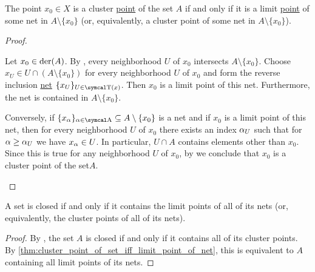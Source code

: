 \begin{proposition}\label{thm:cluster_point_of_set_iff_limit_point_of_net}
  The point \( x_0 \in X \) is a cluster \hyperref[def:topological_derived_set/cluster_point]{point} of the set \( A \) if and only if it is a limit \hyperref[def:net_convergence/cluster]{point} of some net in \( A \setminus \{ x_0 \} \) (or, equivalently, a cluster point of some net in \( A \setminus \{ x_0 \} \)).
\end{proposition}
\begin{proof}\mbox{}
  \begin{description}
    \Implies Let \( x_0 \in \operatorname{der}(A) \). By , every neighborhood \( U \) of \( x_0 \) intersects \( A \setminus \{ x_0 \} \). Choose\LEM \( x_U \in U \cap (A \setminus \{ x_0 \}) \) for every neighborhood \( U \) of \( x_0 \) and form the reverse inclusion \hyperref[ex:reverse_inclusion_net]{net} \( \{ x_U \}_{U \in \CT(x)} \). Then \( x_0 \) is a limit point of this net. Furthermore, the net is contained in \( A \setminus \{ x_0 \} \).

    \ImpliedBy Conversely, if \( \{ x_\al \}_{\al \in \CA} \subseteq A \setminus \{ x_0 \} \) is a net and if \( x_0 \) is a limit point of this net, then for every neighborhood \( U \) of \( x_0 \) there exists an index \( \alpha_U \) such that for \( \alpha \geq \alpha_U \) we have \(  x_\alpha \in U \). In particular, \( U \cap A \) contains elements other than \( x_0 \). Since this is true for any neighborhood \( U \) of \( x_0 \), by  we conclude that \( x_0 \) is a cluster point of the set\( A \).
  \end{description}
\end{proof}

\begin{corollary}\label{thm:closed_iff_contains_all_net_cluster_points}
  A set is closed if and only if it contains the limit points of all of its nets (or, equivalently, the cluster points of all of its nets).
\end{corollary}
\begin{proof}
  By , the set \( A \) is closed if and only if it contains all of its cluster points. By \cref{thm:cluster_point_of_set_iff_limit_point_of_net}, this is equivalent to \( A \) containing all limit points of its nets.
\end{proof}

